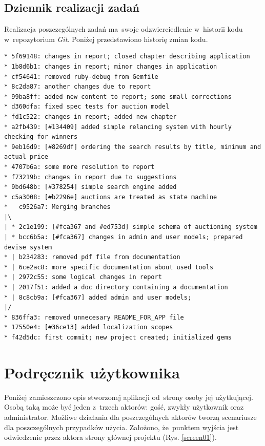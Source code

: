 \subsection{Dziennik realizacji zadań}

Realizacja poszczególnych zadań ma~swoje odzwierciedlenie w~historii kodu w~repozytorium \textit{Git}. Poniżej przedstawiono historię zmian kodu.

\begin{verbatim}
* 5f69148: changes in report; closed chapter describing application
* 1b8d6b1: changes in report; minor changes in application
* cf54641: removed ruby-debug from Gemfile
* 8c2da87: another changes due to report
* 99ba8ff: added new content to report; some small corrections
* d360dfa: fixed spec tests for auction model
* fd1c522: changes in report; added new chapter
* a2fb439: [#134409] added simple relancing system with hourly checking for winners
* 9eb16d9: [#8269df] ordering the search results by title, minimum and actual price
* 4707b6a: some more resolution to report
* f73219b: changes in report due to suggestions
* 9bd648b: [#378254] simple search engine added
* c5a3008: [#b2296e] auctions are treated as state machine
*   c9526a7: Merging branches
|\
| * 2c1e199: [#fca367 and #ed753d] simple schema of auctioning system
| * bcc6b5a: [#fca367] changes in admin and user models; prepared devise system
* | b234283: removed pdf file from documentation
* | 6ce2ac8: more specific documentation about used tools
* | 2972c55: some logical changes in report
* | 2017f51: added a doc directory containing a documentation
* | 8c8cb9a: [#fca367] added admin and user models;
|/
* 836ffa3: removed unnecesary README_FOR_APP file
* 17550e4: [#36ce13] added localization scopes
* f42d5dc: first commit; new project created; initialized gems
\end{verbatim}

\section{Podręcznik użytkownika}

Poniżej zamieszczono opis stworzonej aplikacji od~strony osoby jej użytkującej. Osobą taką może być jeden z~trzech aktorów: gość, zwykły użytkownik oraz administrator. Możliwe działania dla poszczególnych aktorów tworzą scenariusze dla poszczególnych przypadków użycia. Założono, że~punktem wyjścia jest odwiedzenie przez aktora strony głównej projektu (Rys. \ref{screen01}).

